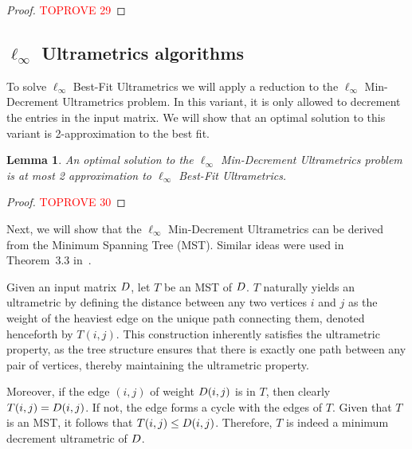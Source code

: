 \documentclass{article}
\newtheorem{lemma}[theorem]{Lemma}
\begin{document}
\newcommand{\infnorm}[1]{\lVert #1 \rVert_{\infty}}

\linftylowerbound*

\begin{proof}\textcolor{red}{TOPROVE 29}\end{proof}

\subsection{\texorpdfstring{$\ell_\infty$ Ultrametrics algorithms}{l-inf Ultrametrics algorithms}}

\newcommand{\infopttree}{O}
\newcommand{\infmdopttree}{\bar{O}}
\newcommand{\maxoftwo}[2]{\max \{ #1, #2 \}}
\newcommand{\optcost}{c}

To solve $\ell_\infty$ Best-Fit Ultrametrics we will apply a reduction to the $\ell_\infty$ Min-Decrement Ultrametrics problem. In this variant, it is only allowed to decrement the entries in the input matrix. We will show that an optimal solution to this variant is 2-approximation to the best fit.
\begin{lemma}\label{lemma:md_approximation}
An optimal solution to the $\ell_\infty$ Min-Decrement Ultrametrics problem is at most 2 approximation to $\ell_\infty$ Best-Fit Ultrametrics.
\end{lemma}

\begin{proof}\textcolor{red}{TOPROVE 30}\end{proof}

Next, we will show that the  $\ell_\infty$ Min-Decrement Ultrametrics can be derived from the Minimum Spanning Tree (MST). Similar ideas were used in Theorem~3.3 in~\cite{agarwala}.

Given an input matrix $D$, let $T$ be an MST of $D$.
$T$ naturally yields an ultrametric by defining the distance between any two vertices $i$ and $j$ as the weight of the heaviest edge on the unique path connecting them, denoted henceforth by $T ({i,j})$.
This construction inherently satisfies the ultrametric property, as the tree structure ensures that there is exactly one path between any pair of vertices, thereby maintaining the ultrametric property.

Moreover, if the edge $(i,j)$ of weight $D (i,j)$ is in $T$, then clearly $T ({i,j})=D (i,j)$. If not, the edge forms a cycle with the edges of $T$. Given that $T$ is an MST, it follows that $T ({i,j}) \leq D (i,j)$. Therefore, $T$ is indeed a minimum decrement ultrametric of $D$.
\end{document}
